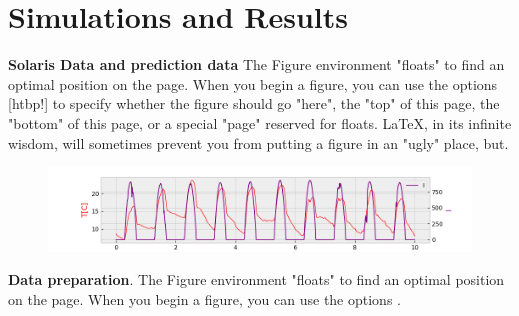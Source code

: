 \section{Simulations and Results}
\textbf{Solaris Data and prediction data}
The Figure environment "floats" to find an optimal position on the page. When you begin a figure, you can use the options [htbp!] to specify whether the figure should go "here", the "top" of this page, the "bottom" of this page, or a special "page" reserved for floats. LaTeX, in its infinite wisdom, will sometimes prevent you from putting a figure in an "ugly" place, but.


\begin{figure}[!hbt]
    \includegraphics[width=1.2\linewidth]{images/solaris2}
\end{figure}


\textbf{Data preparation}.
The Figure environment "floats" to find an optimal position on the page. When you begin a figure, you can use the options .


